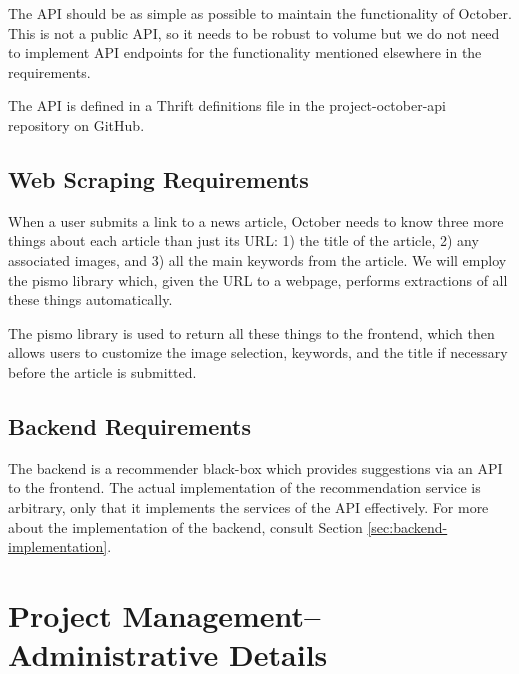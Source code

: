 \documentclass[11pt,letterpaper]{article}
\begin{document}
The API should be as simple as possible to maintain the functionality of October. This is not a public API, so it needs to be robust to volume but we do not need to implement API endpoints for the functionality mentioned elsewhere in the requirements.

The API is defined in a Thrift definitions file in the project-october-api repository on GitHub\cite{project-october-api}.

\subsection{Web Scraping Requirements}
\label{sec:scraping}
When a user submits a link to a news article, October needs to know three more things about each article than just its URL: 1) the title of the article, 2) any associated images, and 3) all the main keywords from the article.
We will employ the pismo library\cite{pismo} which, given the URL to a webpage, performs extractions of all these things automatically.

The pismo library is used to return all these things to the frontend, which then allows users to customize the image selection, keywords, and the title if necessary before the article is submitted.

\subsection{Backend Requirements} %
The backend is a recommender black-box which provides suggestions via an API to the frontend.
The actual implementation of the recommendation service is arbitrary, only that it implements the services of the API effectively.
For more about the implementation of the backend, consult Section \ref{sec:backend-implementation}.

\section{Project Management--Administrative Details}
\end{document}
